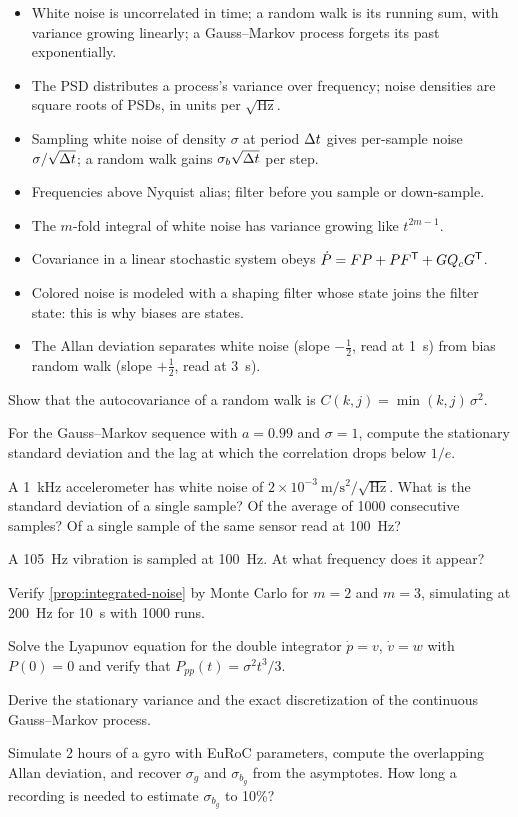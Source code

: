 \begin{takeaways}
\begin{itemize}
  \item White noise is uncorrelated in time; a random walk is its running sum, with variance growing linearly; a Gauss--Markov process
        forgets its past exponentially.
  \item The PSD distributes a process's variance over frequency; noise densities are square roots of PSDs, in units per $\sqrt{\mathrm{Hz}}$.
  \item Sampling white noise of density $\sigma$ at period ${\Delta t}$ gives per-sample noise $\sigma/\sqrt{{\Delta t}}$; a random walk gains $\sigma_b\sqrt{{\Delta t}}$ per step.
  \item Frequencies above Nyquist alias; filter before you sample or down-sample.
  \item The $m$-fold integral of white noise has variance growing like $t^{2m-1}$.
  \item Covariance in a linear stochastic system obeys $\dot P = FP + PF^{\mathsf{T}} + GQ_cG^{\mathsf{T}}$.
  \item Colored noise is modeled with a shaping filter whose state joins the filter state: this is why biases are states.
  \item The Allan deviation separates white noise (slope $-\tfrac12$, read at 1~s) from bias random walk (slope $+\tfrac12$, read at 3~s).
\end{itemize}
\end{takeaways}

\begin{exercises}
  \item Show that the autocovariance of a random walk is $C(k, j) = \min(k, j)\,\sigma^2$.
  \item For the Gauss--Markov sequence with $a = 0.99$ and $\sigma = 1$, compute the stationary standard deviation and the lag at which the
        correlation drops below $1/e$.
  \item A 1~kHz accelerometer has white noise of $2\times10^{-3}~\mathrm{m/s^2/\sqrt{Hz}}$. What is the standard deviation of a single sample? Of the average
        of 1000 consecutive samples? Of a single sample of the same sensor read at 100~Hz?
  \item A 105~Hz vibration is sampled at 100~Hz. At what frequency does it appear?
  \item Verify \cref{prop:integrated-noise} by Monte Carlo for $m = 2$ and $m = 3$, simulating at 200~Hz for 10~s with 1000 runs.
  \item Solve the Lyapunov equation for the double integrator $\dot p = v$, $\dot v = w$ with $P(0) = 0$ and verify that $P_{pp}(t) = \sigma^2t^3/3$.
  \item Derive the stationary variance and the exact discretization of the continuous Gauss--Markov process.
  \item Simulate 2 hours of a gyro with EuRoC parameters, compute the overlapping Allan deviation, and recover $\sigma_g$ and $\sigma_{b_g}$ from the
        asymptotes. How long a recording is needed to estimate $\sigma_{b_g}$ to 10\%?
\end{exercises}

